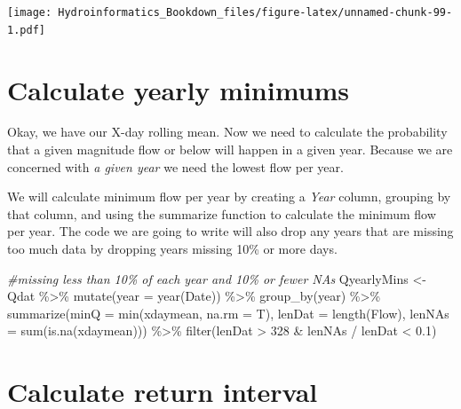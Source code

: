 \documentclass[
]{book}
\newenvironment{Shaded}{\begin{snugshade}}{\end{snugshade}}
\newcommand{\AttributeTok}[1]{\textcolor[rgb]{0.77,0.63,0.00}{#1}}
\newcommand{\CommentTok}[1]{\textcolor[rgb]{0.56,0.35,0.01}{\textit{#1}}}
\newcommand{\DecValTok}[1]{\textcolor[rgb]{0.00,0.00,0.81}{#1}}
\newcommand{\FloatTok}[1]{\textcolor[rgb]{0.00,0.00,0.81}{#1}}
\newcommand{\FunctionTok}[1]{\textcolor[rgb]{0.00,0.00,0.00}{#1}}
\newcommand{\NormalTok}[1]{#1}
\newcommand{\OtherTok}[1]{\textcolor[rgb]{0.56,0.35,0.01}{#1}}
\newcommand{\SpecialCharTok}[1]{\textcolor[rgb]{0.00,0.00,0.00}{#1}}
\begin{document}
\texttt{[image: Hydroinformatics\_Bookdown\_files/figure-latex/unnamed-chunk-99-1.pdf]}

\hypertarget{calculate-yearly-minimums}{%
\section{Calculate yearly minimums}\label{calculate-yearly-minimums}}

Okay, we have our X-day rolling mean. Now we need to calculate the probability that a given magnitude flow or below will happen in a given year. Because we are concerned with \emph{a given year} we need the lowest flow per year.

We will calculate minimum flow per year by creating a \emph{Year} column, grouping by that column, and using the summarize function to calculate the minimum flow per year. The code we are going to write will also drop any years that are missing too much data by dropping years missing 10\% or more days.

\begin{Shaded}
\begin{Highlighting}[]
\CommentTok{\#missing less than 10\% of each year and 10\% or fewer NAs}
\NormalTok{QyearlyMins }\OtherTok{\textless{}{-}}\NormalTok{ Qdat }\SpecialCharTok{\%\textgreater{}\%} \FunctionTok{mutate}\NormalTok{(}\AttributeTok{year =} \FunctionTok{year}\NormalTok{(Date)) }\SpecialCharTok{\%\textgreater{}\%}
                        \FunctionTok{group\_by}\NormalTok{(year) }\SpecialCharTok{\%\textgreater{}\%}
                        \FunctionTok{summarize}\NormalTok{(}\AttributeTok{minQ =} \FunctionTok{min}\NormalTok{(xdaymean, }\AttributeTok{na.rm =}\NormalTok{ T), }
                                  \AttributeTok{lenDat =} \FunctionTok{length}\NormalTok{(Flow),}
                                  \AttributeTok{lenNAs =} \FunctionTok{sum}\NormalTok{(}\FunctionTok{is.na}\NormalTok{(xdaymean))) }\SpecialCharTok{\%\textgreater{}\%}
                        \FunctionTok{filter}\NormalTok{(lenDat }\SpecialCharTok{\textgreater{}} \DecValTok{328} \SpecialCharTok{\&}\NormalTok{ lenNAs }\SpecialCharTok{/}\NormalTok{ lenDat }\SpecialCharTok{\textless{}} \FloatTok{0.1}\NormalTok{) }
\end{Highlighting}
\end{Shaded}

\hypertarget{calculate-return-interval}{%
\section{Calculate return interval}\label{calculate-return-interval}}
\end{document}
